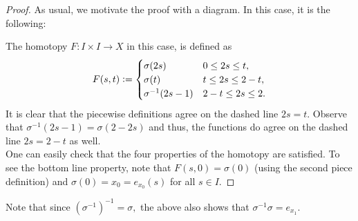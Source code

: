 \documentclass[12pt]{article}
\begin{document}
\begin{proof} 
	As usual, we motivate the proof with a diagram. In this case, it is the following:
	\begin{center}
	\end{center}
	The homotopy $F:I \times I \to X$ in this case, is defined as
	\begin{equation*} 
		F(s, t) \vcentcolon= \begin{cases}
			\sigma(2s) & 0 \le 2s \le t,\\
			\sigma(t) & t \le 2s \le 2 - t,\\
			\sigma^{-1}(2s - 1) & 2 - t \le 2s \le 2.
		\end{cases}
	\end{equation*}
	It is clear that the piecewise definitions agree on the dashed line $2s = t.$ Observe that $\sigma^{-1}(2s - 1) = \sigma(2 - 2s)$ and thus, the functions do agree on the dashed line $2s = 2 - t$ as well. \\
	One can easily check that the four properties of the homotopy are satisfied. To see the bottom line property, note that $F(s, 0) = \sigma(0)$ (using the second piece definition) and $\sigma(0) = x_0 = e_{x_0}(s)$ for all $s \in I.$
\end{proof}

Note that since $(\sigma^{-1})^{-1} = \sigma,$ the above also shows that $\sigma^{-1}\sigma = e_{x_1}.$
\end{document}
